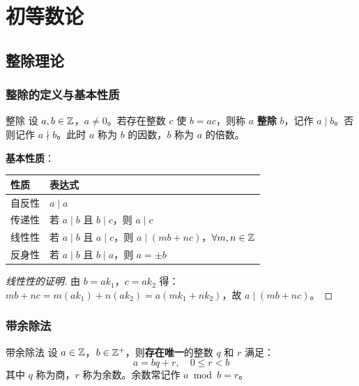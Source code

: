 \chapter{初等数论}

\section{整除理论}

\subsection{整除的定义与基本性质}

\begin{mydefinition}{整除}
设 \(a,b\in\mathbb{Z}\)，\(a\neq 0\)。若存在整数 \(c\) 使 \(b=ac\)，则称 \(a\) \textbf{整除} \(b\)，记作 \(a\mid b\)。否则记作 \(a\nmid b\)。此时 \(a\) 称为 \(b\) 的因数，\(b\) 称为 \(a\) 的倍数。
\end{mydefinition}

\textbf{基本性质}：

\begin{table}[H]
\centering
\begin{tabular}{ll}
\toprule
性质 & 表达式 \\
\midrule
自反性 & \(a\mid a\) \\
传递性 & 若 \(a\mid b\) 且 \(b\mid c\)，则 \(a\mid c\) \\
线性性 & 若 \(a\mid b\) 且 \(a\mid c\)，则 \(a\mid (mb+nc)\)，\(\forall m,n\in\mathbb{Z}\) \\
反身性 & 若 \(a\mid b\) 且 \(b\mid a\)，则 \(a=\pm b\) \\
\bottomrule
\end{tabular}
\end{table}

\begin{proof}[线性性的证明]
由 \(b=ak_1\)，\(c=ak_2\) 得：\(mb+nc = m(ak_1) + n(ak_2) = a(mk_1+nk_2)\)，故 \(a\mid (mb+nc)\)。
\end{proof}

\subsection{带余除法}

\begin{myTheorem}{带余除法}
设 \(a\in\mathbb{Z}\)，\(b\in\mathbb{Z}^+\)，则\textbf{存在唯一}的整数 \(q\) 和 \(r\) 满足：
\[
a = bq + r, \quad 0 \leqslant r < b
\]
其中 \(q\) 称为商，\(r\) 称为余数。余数常记作 \(a\bmod b = r\)。
\end{myTheorem}

